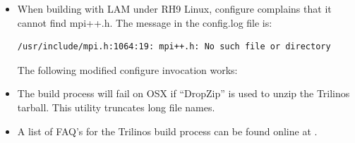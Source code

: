 \begin{itemize}
\item When building with LAM under RH9 Linux, configure complains that it 
cannot find mpi++.h.  The message in the config.log file is:
\begin{verbatim}
/usr/include/mpi.h:1064:19: mpi++.h: No such file or directory
\end{verbatim}
The following modified configure invocation works:

\item The build process will fail on OSX if ``DropZip'' is used to 
unzip the Trilinos tarball.  This utility truncates long file names.

\item A list of FAQ's for the Trilinos build process can be found online at
\newline{}.

\end{itemize}

